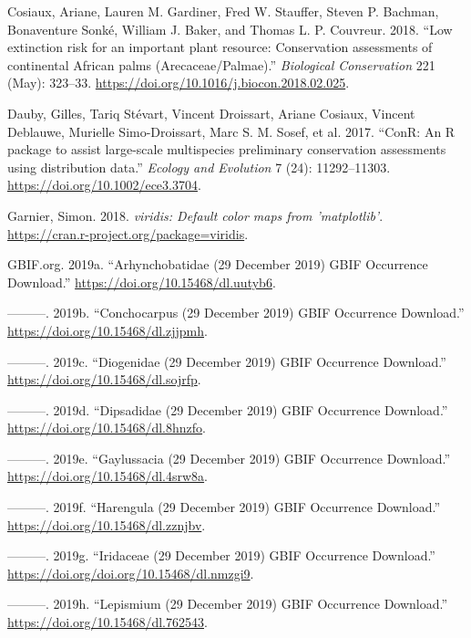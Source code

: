 \documentclass[fleqn,10pt,lineno]{wlpeerj} %
\begin{document}
\leavevmode\hypertarget{ref-Cosiaux2018}{}%
Cosiaux, Ariane, Lauren M. Gardiner, Fred W. Stauffer, Steven P. Bachman, Bonaventure Sonké, William J. Baker, and Thomas L. P. Couvreur. 2018. ``Low extinction risk for an important plant resource: Conservation assessments of continental African palms (Arecaceae/Palmae).'' \emph{Biological Conservation} 221 (May): 323--33. \url{https://doi.org/10.1016/j.biocon.2018.02.025}.

\leavevmode\hypertarget{ref-Dauby2017}{}%
Dauby, Gilles, Tariq Stévart, Vincent Droissart, Ariane Cosiaux, Vincent Deblauwe, Murielle Simo-Droissart, Marc S. M. Sosef, et al. 2017. ``ConR: An R package to assist large-scale multispecies preliminary conservation assessments using distribution data.'' \emph{Ecology and Evolution} 7 (24): 11292--11303. \url{https://doi.org/10.1002/ece3.3704}.

\leavevmode\hypertarget{ref-Garnier2018}{}%
Garnier, Simon. 2018. \emph{viridis: Default color maps from 'matplotlib'}. \url{https://cran.r-project.org/package=viridis}.

\leavevmode\hypertarget{ref-GBIForg2019c}{}%
GBIF.org. 2019a. ``Arhynchobatidae (29 December 2019) GBIF Occurrence Download.'' \url{https://doi.org/10.15468/dl.uutyb6}.

\leavevmode\hypertarget{ref-GBIForg2019f}{}%
---------. 2019b. ``Conchocarpus (29 December 2019) GBIF Occurrence Download.'' \url{https://doi.org/10.15468/dl.zjjpmh}.

\leavevmode\hypertarget{ref-GBIForg2019}{}%
---------. 2019c. ``Diogenidae (29 December 2019) GBIF Occurrence Download.'' \url{https://doi.org/10.15468/dl.sojrfp}.

\leavevmode\hypertarget{ref-GBIForg2019d}{}%
---------. 2019d. ``Dipsadidae (29 December 2019) GBIF Occurrence Download.'' \url{https://doi.org/10.15468/dl.8hnzfo}.

\leavevmode\hypertarget{ref-GBIForg2019g}{}%
---------. 2019e. ``Gaylussacia (29 December 2019) GBIF Occurrence Download.'' \url{https://doi.org/10.15468/dl.4srw8a}.

\leavevmode\hypertarget{ref-GBIForg2019e}{}%
---------. 2019f. ``Harengula (29 December 2019) GBIF Occurrence Download.'' \url{https://doi.org/10.15468/dl.zznjbv}.

\leavevmode\hypertarget{ref-GBIForg2019j}{}%
---------. 2019g. ``Iridaceae (29 December 2019) GBIF Occurrence Download.'' \url{https://doi.org/doi.org/10.15468/dl.nmzgi9}.

\leavevmode\hypertarget{ref-GBIForg2019i}{}%
---------. 2019h. ``Lepismium (29 December 2019) GBIF Occurrence Download.'' \url{https://doi.org/10.15468/dl.762543}.
\end{document}
